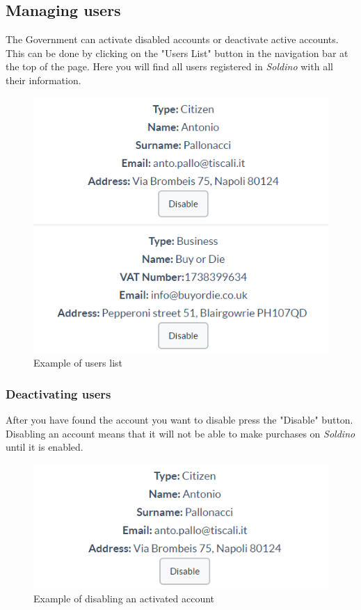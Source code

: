 	\subsection{Managing users}
	The Government can activate disabled accounts or deactivate active accounts.
	This can be done by clicking on the "Users List" button in the navigation
	bar at the top of the page. Here you will find all users registered in 
	\textit{Soldino} with all their information.
	\begin{figure}[H]
		\includegraphics[width=13cm]{res/images/users_list.png}
		\centering
		\caption{Example of users list}
	\end{figure}
		\subsubsection{Deactivating users}
		After you have found the account you want to disable press the 
		"Disable" button. Disabling an account means that it will not be able to make purchases on \textit{Soldino} 
		until it is enabled.
		\begin{figure}[H]
			\includegraphics[width=13cm]{res/images/users_disable.png}
			\centering
			\caption{Example of disabling an activated account}
		\end{figure}
